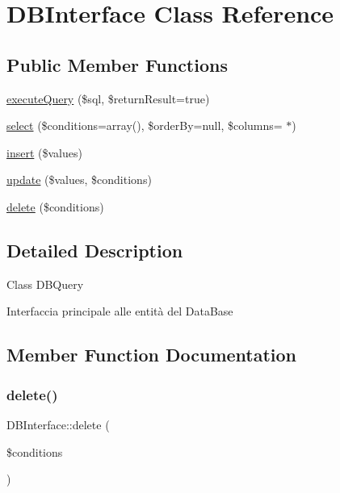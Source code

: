 \hypertarget{classDBInterface}{}\section{D\+B\+Interface Class Reference}
\label{classDBInterface}
\subsection*{Public Member Functions}
\begin{DoxyCompactItemize}
\item 
\hyperlink{classDBInterface_a2905fdee8534fce9f05cb5ce3397fc62}{execute\+Query} (\$sql, \$return\+Result=true)
\item 
\hyperlink{classDBInterface_ad9eb9ac3721763efa361790944381adf}{select} (\$conditions=array(), \$order\+By=null, \$columns=\textquotesingle{} $\ast$\textquotesingle{})
\item 
\hyperlink{classDBInterface_a1d018eff9c97ff01de496751d58a3550}{insert} (\$values)
\item 
\hyperlink{classDBInterface_a6dbc8e4d2ce5a8eb5a49362f78ac7e86}{update} (\$values, \$conditions)
\item 
\hyperlink{classDBInterface_ac5ca55e023ccd1c2f9fc30052541a680}{delete} (\$conditions)
\end{DoxyCompactItemize}


\subsection{Detailed Description}
Class D\+B\+Query

Interfaccia principale alle entità del Data\+Base 

\subsection{Member Function Documentation}
\mbox{\label{classDBInterface_ac5ca55e023ccd1c2f9fc30052541a680}} 
\subsubsection{\texorpdfstring{delete()}{delete()}}
{\footnotesize\ttfamily D\+B\+Interface\+::delete (\begin{DoxyParamCaption}\item[{}]{\$conditions }\end{DoxyParamCaption})}

